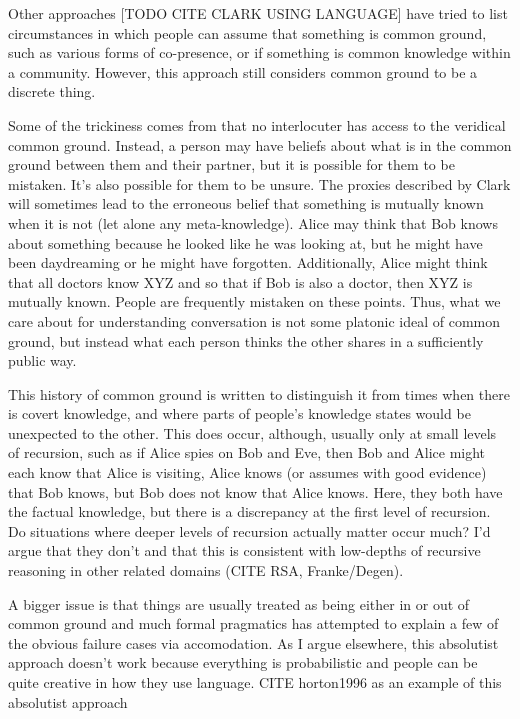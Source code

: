 \documentclass[]{article}
\begin{document}
Other approaches [TODO CITE CLARK USING LANGUAGE] have tried to list circumstances in which people can assume that something is common ground, such as various forms of co-presence, or if something is common knowledge within a community. However, this approach still considers common ground to be a discrete thing. 

Some of the trickiness comes from that no interlocuter has access to the veridical common ground. Instead, a person may have beliefs about what is in the common ground between them and their partner, but it is possible for them to be mistaken. It's also possible for them to be unsure. The proxies described by Clark will sometimes lead to the erroneous belief that something is mutually known when it is not (let alone any meta-knowledge). Alice may think that Bob knows about something because he looked like he was looking at, but he might have been daydreaming or he might have forgotten. Additionally, Alice might think that all doctors know XYZ and so that if Bob is also a doctor, then XYZ is mutually known. People are frequently mistaken on these points. Thus, what we care about for understanding conversation is not some platonic ideal of common ground, but instead what each person thinks the other shares in a sufficiently public way. 

This history of common ground is written to distinguish it from times when there is covert knowledge, and where parts of people's knowledge states would be unexpected to the other. This does occur, although, usually only at small levels of recursion, such as if Alice spies on Bob and Eve, then Bob and Alice might each know that Alice is visiting, Alice knows (or assumes with good evidence) that Bob knows, but Bob does not know that Alice knows. Here, they both have the factual knowledge, but there is a discrepancy at the first level of recursion. Do situations where deeper levels of recursion actually matter occur much? I'd argue that they don't and that this is consistent with low-depths of recursive reasoning in other related domains (CITE RSA, Franke/Degen). 

A bigger issue is that things are usually treated as being either in or out of common ground and much formal pragmatics has attempted to explain a few of the obvious failure cases via accomodation. As I argue elsewhere, this absolutist approach doesn't work because everything is probabilistic and people can be quite creative in how they use language. CITE horton1996 as an example of this absolutist approach
\end{document}

